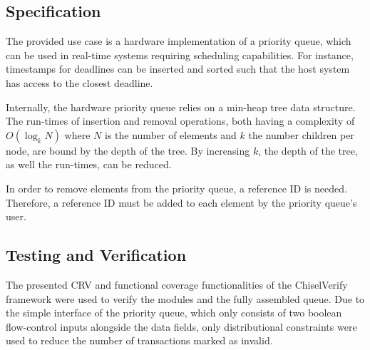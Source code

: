 \documentclass[conference]{IEEEtran}
\begin{document}
\subsection{Specification}

The provided use case is a hardware implementation of a priority queue, which can be used in real-time systems requiring scheduling capabilities. 
For instance, timestamps for deadlines can be inserted and sorted such that the host system has access to the closest deadline.

Internally, the hardware priority queue relies on a min-heap tree data structure. 
The run-times of insertion and removal operations, both having a complexity of $O(\log_k N)$ where $N$ is the number of elements and $k$ the number children per node, are bound by the depth of the tree. 
By increasing $k$, the depth of the tree, as well the run-times, can be reduced.

In order to remove elements from the priority queue, a reference ID is needed. 
Therefore, a reference ID must be added to each element by the priority queue's user.

%
%

\subsection{Testing and Verification}

The presented CRV and functional coverage functionalities of the ChiselVerify framework were used to verify the modules and the fully assembled queue.
Due to the simple interface of the priority queue, which only consists of two boolean flow-control inputs alongside the data fields, only distributional constraints were used to reduce the number of transactions marked as invalid. 
\end{document}

